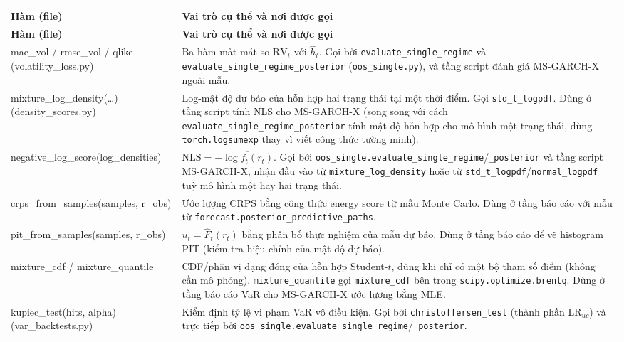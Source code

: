 \documentclass[11pt,a4paper]{article}
\newcommand{\code}[1]{\texttt{#1}}
\newcommand{\file}[1]{\texttt{#1}}
\begin{document}
\begin{longtable}{@{}>{\ttfamily\scriptsize\raggedright\arraybackslash}p{5.0cm} >{\raggedright\arraybackslash}p{9.5cm}@{}}
\toprule
\textbf{\normalfont Hàm (file)} & \textbf{Vai trò cụ thể và nơi được gọi} \\
\midrule
\endfirsthead
\toprule
\textbf{\normalfont Hàm (file)} & \textbf{Vai trò cụ thể và nơi được gọi} \\
\midrule
\endhead
\bottomrule
\endfoot
mae\_vol / rmse\_vol / qlike \newline \footnotesize{(volatility\_loss.py)} & Ba hàm mất mát so $\mathrm{RV}_t$ với $\hat h_t$. Gọi bởi \code{evaluate\_single\_regime} và \code{evaluate\_single\_regime\_posterior} (\file{oos\_single.py}), và tầng script đánh giá MS-GARCH-X ngoài mẫu. \\
mixture\_log\_density(\ldots) \newline \footnotesize{(density\_scores.py)} & Log-mật độ dự báo của hỗn hợp hai trạng thái tại một thời điểm. Gọi \code{std\_t\_logpdf}. Dùng ở tầng script tính NLS cho MS-GARCH-X (song song với cách \code{evaluate\_single\_regime\_posterior} tính mật độ hỗn hợp cho mô hình một trạng thái, dùng \code{torch.logsumexp} thay vì viết công thức tường minh). \\
negative\_log\_score(log\_densities) & $\mathrm{NLS}=-\overline{\log f_t(r_t)}$. Gọi bởi \code{oos\_single.evaluate\_single\_regime}/\code{\_posterior} và tầng script MS-GARCH-X, nhận đầu vào từ \code{mixture\_log\_density} hoặc từ \code{std\_t\_logpdf}/\code{normal\_logpdf} tuỳ mô hình một hay hai trạng thái. \\
crps\_from\_samples(samples, r\_obs) & Ước lượng CRPS bằng công thức energy score từ mẫu Monte Carlo. Dùng ở tầng báo cáo với mẫu từ \code{forecast.posterior\_predictive\_paths}. \\
pit\_from\_samples(samples, r\_obs) & $u_t=\hat F_t(r_t)$ bằng phân bố thực nghiệm của mẫu dự báo. Dùng ở tầng báo cáo để vẽ histogram PIT (kiểm tra hiệu chỉnh của mật độ dự báo). \\
mixture\_cdf / mixture\_quantile & CDF/phân vị dạng đóng của hỗn hợp Student-$t$, dùng khi chỉ có một bộ tham số điểm (không cần mô phỏng). \code{mixture\_quantile} gọi \code{mixture\_cdf} bên trong \code{scipy.optimize.brentq}. Dùng ở tầng báo cáo VaR cho MS-GARCH-X ước lượng bằng MLE. \\
kupiec\_test(hits, alpha) \newline \footnotesize{(var\_backtests.py)} & Kiểm định tỷ lệ vi phạm VaR vô điều kiện. Gọi bởi \code{christoffersen\_test} (thành phần $\mathrm{LR}_{uc}$) và trực tiếp bởi \code{oos\_single.evaluate\_single\_regime}/\code{\_posterior}. \\

\end{longtable}
\end{document}
